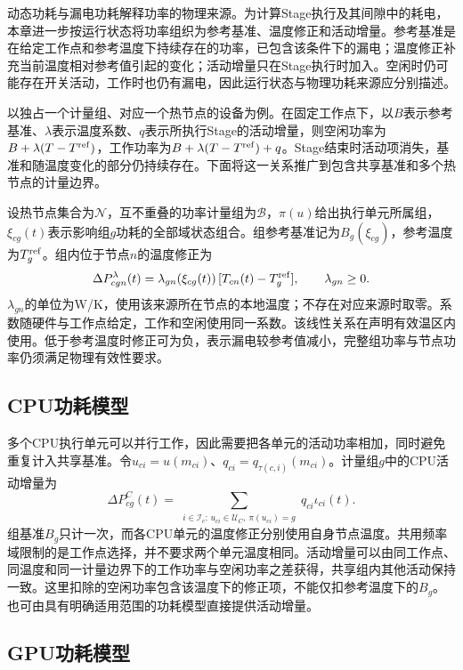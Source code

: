 动态功耗与漏电功耗解释功率的物理来源。为计算Stage执行及其间隙中的耗电，本章进一步按运行状态将功率组织为参考基准、温度修正和活动增量。参考基准是在给定工作点和参考温度下持续存在的功率，已包含该条件下的漏电；温度修正补充当前温度相对参考值引起的变化；活动增量只在Stage执行时加入。空闲时仍可能存在开关活动，工作时也仍有漏电，因此运行状态与物理功耗来源应分别描述。

以独占一个计量组、对应一个热节点的设备为例。在固定工作点下，以\(B\)表示参考基准、\(\lambda\)表示温度系数、\(q\)表示所执行Stage的活动增量，则空闲功率为\(B+\lambda(T-T^{\rm ref})\)，工作功率为\(B+\lambda(T-T^{\rm ref})+q\)。Stage结束时活动项消失，基准和随温度变化的部分仍持续存在。下面将这一关系推广到包含共享基准和多个热节点的计量边界。

设热节点集合为\(\mathcal N\)，互不重叠的功率计量组为\(\mathcal B\)，\(\pi(u)\)给出执行单元所属组，\(\xi_{cg}(t)\)表示影响组\(g\)功耗的全部域状态组合。组参考基准记为\(B_g(\xi_{cg})\)，参考温度为\(T_g^{\rm ref}\)。组内位于节点\(n\)的温度修正为
\begin{equation}
\Delta P^\lambda_{cgn}(t)=
\lambda_{gn}(\xi_{cg}(t))\,[T_{cn}(t)-T_g^{\rm ref}],
\qquad\lambda_{gn}\ge0.
\label{eq:local-leakage}
\end{equation}
\(\lambda_{gn}\)的单位为W/K，使用该来源所在节点的本地温度；不存在对应来源时取零。系数随硬件与工作点给定，工作和空闲使用同一系数。该线性关系在声明有效温区内使用。低于参考温度时修正可为负，表示漏电较参考值减小，完整组功率与节点功率仍须满足物理有效性要求。

\subsection{CPU功耗模型}

多个CPU执行单元可以并行工作，因此需要把各单元的活动功率相加，同时避免重复计入共享基准。令\(u_{ci}=u(m_{ci})\)、\(q_{ci}=q_{\tau(c,i)}(m_{ci})\)。计量组\(g\)中的CPU活动增量为
\begin{equation}
\Delta P^{C}_{cg}(t)=
\sum_{\substack{i\in\mathcal I_c:\,u_{ci}\in\mathcal U_C,\ \pi(u_{ci})=g}}
q_{ci}\iota_{ci}(t).
\label{eq:cpu-active-power}
\end{equation}
组基准\(B_g\)只计一次，而各CPU单元的温度修正分别使用自身节点温度。共用频率域限制的是工作点选择，并不要求两个单元温度相同。活动增量可以由同工作点、同温度和同一计量边界下的工作功率与空闲功率之差获得，共享组内其他活动保持一致。这里扣除的空闲功率包含该温度下的修正项，不能仅扣参考温度下的\(B_g\)。也可由具有明确适用范围的功耗模型直接提供活动增量。

\subsection{GPU功耗模型}

